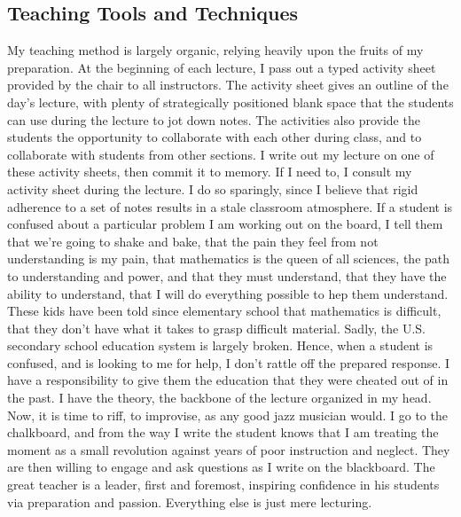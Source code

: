 \documentclass[12pt,oneside]{amsart}
\begin{document}
\subsection{Teaching Tools and Techniques} My teaching method is largely
organic, relying heavily upon the fruits of my preparation. At the beginning of
each lecture, I pass out a typed activity sheet provided by the chair to all
instructors. The activity sheet gives an outline of the day's lecture, with
plenty of strategically positioned blank space that the students can use during
the lecture to jot down notes. The activities also provide the students the
opportunity to collaborate with each other during class, and to collaborate with
students from other sections.  I write out my lecture on one of these activity
sheets, then commit it to memory. If I need to, I consult my activity sheet
during the lecture. I do so sparingly, since I believe that rigid adherence to a
set of notes results in a stale classroom atmosphere.  If a student is confused
about a particular problem I am working out on the board, I tell them that we're
going to shake and bake, that the pain they feel from not understanding is my
pain, that mathematics is the queen of all sciences, the path to understanding
and power, and that they must understand, that they have the ability to
understand, that I will do everything possible to hep them understand. These
kids have been told since elementary school that mathematics is difficult, that
they don't have what it takes to grasp difficult material. Sadly, the U.S.
secondary school education system is largely broken.  Hence, when a student is
confused, and is looking to me for help, I don't rattle off the prepared
response. I have a responsibility to give them the education that they were
cheated out of in the past. I have the theory, the backbone of the lecture
organized in my head. Now, it is time to riff, to improvise, as any good jazz
musician would. I go to the chalkboard, and from the way I write the student
knows that I am treating the moment as a small revolution against years of poor
instruction and neglect. They are then willing to engage and ask questions as I
write on the blackboard. The great teacher is a leader, first and foremost,
inspiring confidence in his students via preparation and passion.  Everything
else is just mere lecturing.
\end{document}
